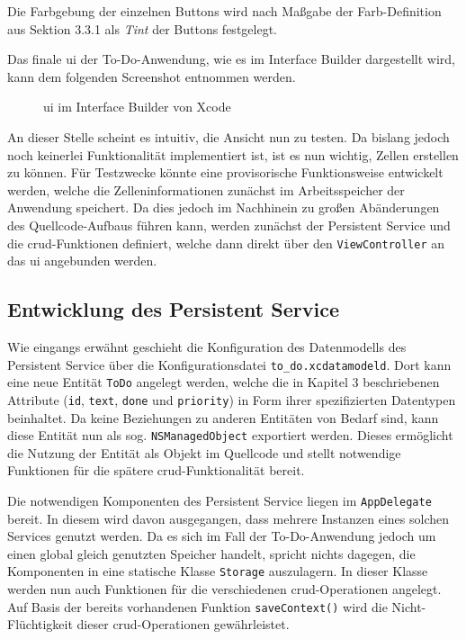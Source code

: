 Die Farbgebung der einzelnen Buttons wird nach Maßgabe der Farb-Definition aus Sektion 3.3.1 als \textit{Tint} der Buttons festgelegt.

Das finale \ac{ui} der To-Do-Anwendung, wie es im Interface Builder dargestellt wird, kann dem folgenden Screenshot entnommen werden.

\begin{figure}[h!]
	\centering
	\caption{\ac{ui} im Interface Builder von Xcode}
\end{figure} 

An dieser Stelle scheint es intuitiv, die Ansicht nun zu testen. Da bislang jedoch noch keinerlei Funktionalität implementiert ist, ist es nun wichtig, Zellen erstellen zu können. Für Testzwecke könnte eine provisorische Funktionsweise entwickelt werden, welche die Zelleninformationen zunächst im Arbeitsspeicher der Anwendung speichert. Da dies jedoch im Nachhinein zu großen Abänderungen des Quellcode-Aufbaus führen kann, werden zunächst der Persistent Service und die \ac{crud}-Funktionen definiert, welche dann direkt über den \texttt{ViewController} an das \ac{ui} angebunden werden.

\subsection{Entwicklung des Persistent Service}
Wie eingangs erwähnt geschieht die Konfiguration des Datenmodells des Persistent Service über die Konfigurationsdatei \texttt{to\_do.xcdatamodeld}. Dort kann eine neue Entität \texttt{ToDo} angelegt werden, welche die in Kapitel 3 beschriebenen Attribute (\texttt{id}, \texttt{text}, \texttt{done} und \texttt{priority}) in Form ihrer spezifizierten Datentypen beinhaltet. Da keine Beziehungen zu anderen Entitäten von Bedarf sind, kann diese Entität nun als sog. \texttt{NSManagedObject} exportiert werden. Dieses ermöglicht die Nutzung der Entität als Objekt im Quellcode und stellt notwendige Funktionen für die spätere \ac{crud}-Funktionalität bereit.

Die notwendigen Komponenten des Persistent Service liegen im \texttt{AppDelegate} bereit. In diesem wird davon ausgegangen, dass mehrere Instanzen eines solchen Services genutzt werden. Da es sich im Fall der To-Do-Anwendung jedoch um einen global gleich genutzten Speicher handelt, spricht nichts dagegen, die Komponenten in eine statische Klasse \texttt{Storage} auszulagern. In dieser Klasse werden nun auch Funktionen für die verschiedenen \ac{crud}-Operationen angelegt. Auf Basis der bereits vorhandenen Funktion \texttt{saveContext()} wird die Nicht-Flüchtigkeit dieser \ac{crud}-Operationen gewährleistet.

